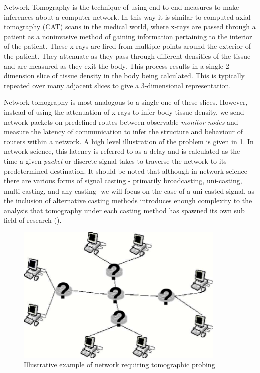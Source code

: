 Network Tomography is the technique of using end-to-end measures to make inferences about a computer network. In this way it is similar to computed axial tomography (CAT) scans in the medical world, where x-rays are passed through a patient as a noninvasive method of gaining information pertaining to the interior of the patient. These x-rays are fired from multiple points around the exterior of the patient. They attenuate as they pass through different densities of the tissue and are measured as they exit the body. This process results in a single 2 dimension slice of tissue density in the body being calculated. This is typically repeated over many adjacent slices to give a 3-dimensional representation.\par
Network tomography is most analogous to a single one of these slices. However, instead of using the attenuation of x-rays to infer body tissue density, we send network packets on predefined routes between observable \textit{monitor nodes} and measure the latency of communication to infer the structure and behaviour of routers within a network. A high level illustration of the problem is given in \ref{fig:nettom?}. In network science, this latency is referred to as a delay and is calculated as the time a given \textit{packet} or discrete signal takes to traverse the network to its predetermined destination. It should be noted that although in network science there are various forms of signal casting - primarily broadcasting, uni-casting, multi-casting, and any-casting- we will focus on the case of a uni-casted signal, as the inclusion of alternative casting methods introduces enough complexity to the analysis that tomography under each casting method has spawned its own sub field of research (\cite{lawrence_network_2006}).\par
\begin{figure}
    \centering
    \includegraphics[width=10cm]{figs/intro/nettom-illustration.png}
    \caption[Illustrative example of network requiring tomographic probing]{Illustrative example of network requiring tomographic probing \cite{lawrence_network_2006}}
    \label{fig:nettom?}
\end{figure}

